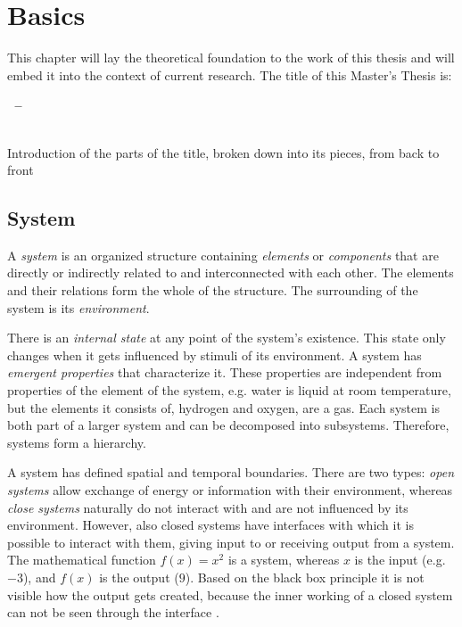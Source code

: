 
\section{Basics}
\label{sec:basics}

This chapter will lay the theoretical foundation to the work of this thesis and will embed it into the context of current research. The title of this Master's Thesis is:

\vspace{-1em}
\begin{center}
\textbf{
	\titleFirst $~$ --\\ [0.2 cm]
	\titleSecond \\
	\titleThird
}
\end{center}

Introduction of the parts of the title, broken down into its pieces, from back to front

\subsection{System} %
\label{sub:system}

A \emph{system} is an organized structure containing \emph{elements} or \emph{components} that are directly or indirectly related to and interconnected with each other. The elements and their relations form the whole of the structure. The surrounding of the system is its \emph{environment}.

There is an \emph{internal state} at any point of the system's existence. This state only changes when it gets influenced by stimuli of its environment. A system has \emph{emergent properties} that characterize it. These properties are independent from properties of the element of the system, e.g. water is liquid at room temperature, but the elements it consists of, hydrogen and oxygen, are a gas. Each system is both part of a larger system and can be decomposed into subsystems. Therefore, systems form a hierarchy.

A system has defined spatial and temporal boundaries. There are two types: \emph{open systems} allow exchange of energy or information with their environment, whereas \emph{close systems} naturally do not interact with and are not influenced by its environment. However, also closed systems have interfaces with which it is possible to interact with them, giving input to or receiving output from a system. The mathematical function $f(x) = x^2$ is a system, whereas $x$ is the input (e.g. $-3$), and $f(x)$ is the output ($9$). Based on the black box principle it is not visible how the output gets created, because the inner working of a closed system can not be seen through the interface
\cite{system}.

